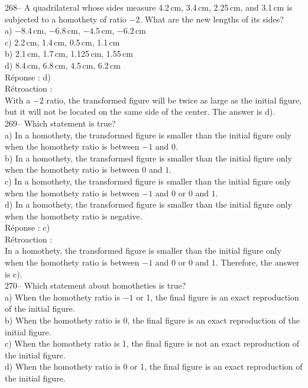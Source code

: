 \documentclass[letterpaper, 12pt]{article}
\begin{document}
268-- A quadrilateral whose sides measure 4.2\,cm, 3.4\,cm,
2.25\,cm, and 3.1\,cm is subjected to a homothety of ratio $-2$.
What are the new lengths of its sides?\\

a) $-8.4$\,cm, $-6.8$\,cm, $-4.5$\,cm, $-6.2$\,cm\\
c) 2.2\,cm, 1.4\,cm, 0.5\,cm, 1.1\,cm\\
b) 2.1\,cm, 1.7\,cm, 1.125\,cm, 1.55\,cm\\
d) 8.4\,cm, 6.8\,cm, 4.5\,cm, 6.2\,cm\\

R\'eponse : d)\\

R\'etroaction : \\
With a $-2$ ratio, the transformed figure will be twice as large as
the initial figure, but it will not be located on the same side of
the center. The answer is d). \\

269-- Which statement is true?\\

a) In a homothety, the transformed figure is smaller than the
initial figure only when the homothety ratio is between $-1$ and 0.\\
b) In a homothety, the transformed figure is smaller than the
initial figure only when the homothety ratio is between 0 and $1$.\\
c) In a homothety, the transformed figure is smaller than the
initial figure only when the homothety ratio is between $-1$ and 0 or 0 and $1$.\\
d) In a homothety, the transformed figure is smaller than the
initial figure only when the homothety ratio is negative.\\

R\'eponse : c)\\

R\'etroaction : \\
In a homothety, the transformed figure is smaller than the initial
figure only when the homothety ratio is between $-1$ and 0 or 0 and
$1$.
Therefore, the answer is c).\\

270-- Which statement about homotheties is true?\\

a) When the homothety ratio is $-1$ or 1, the final figure is an
exact reproduction of the initial figure.\\
b) When the homothety ratio is 0, the final figure is an
exact reproduction of the initial figure.\\
c) When the homothety ratio is 1, the final figure is not an exact
reproduction of the initial figure.\\
d) When the homothety ratio is 0 or 1, the final figure is an exact
reproduction of the initial figure.\\
\end{document}
